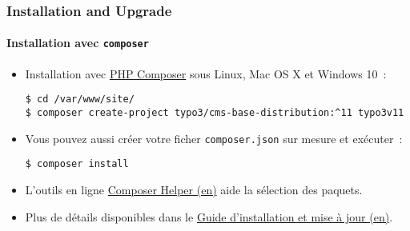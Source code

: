 %

\begin{frame}[fragile]
	\frametitle{Installation and Upgrade}
	\framesubtitle{Installation avec \texttt{composer}}


	\begin{itemize}
		\item Installation avec \href{https://getcomposer.org}{PHP Composer} sous Linux, Mac OS X et Windows 10~:
\begin{lstlisting}
$ cd /var/www/site/
$ composer create-project typo3/cms-base-distribution:^11 typo3v11
\end{lstlisting}

		\item Vous pouvez aussi créer votre ficher \texttt{composer.json} sur mesure
			et exécuter~:
\begin{lstlisting}
$ composer install
\end{lstlisting}

		\item L'outils en ligne \href{https://get.typo3.org/misc/composer/helper}{Composer Helper (en)}
			aide la sélection des paquets.

		\item Plus de détails disponibles dans le
			\href{https://docs.typo3.org/m/typo3/guide-installation/master/en-us/}{Guide d'installation et mise à jour (en)}.

	\end{itemize}
\end{frame}

